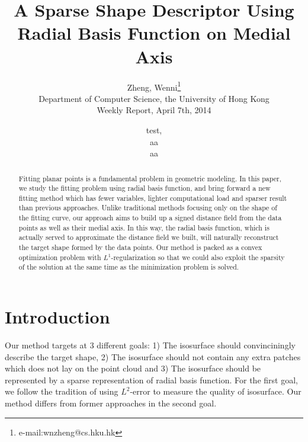 \documentclass[annual]{acmsiggraph}
\title{A Sparse Shape Descriptor Using Radial Basis Function on Medial Axis}
\author{Zheng, Wenni\thanks{e-mail:wnzheng@cs.hku.hk}\\Department of Computer Science, the University of Hong Kong\\Weekly Report, April 7th, 2014}
\author{test,\\aa\\aa}
\begin{document}

\maketitle

\begin{abstract}

Fitting planar points is a fundamental problem in geometric modeling. In this paper, we study the fitting problem using radial basis function, and bring forward a new fitting method which has fewer variables, lighter computational load and sparser result than previous approaches. Unlike traditional methods focusing only on the shape of the fitting curve, our approach aims to build up a signed distance field from the data points as well as their medial axis. In this way, the radial basis function, which is actually served to approximate the distance field we built, will naturally reconstruct the target shape formed by the data points. Our method is packed as a convex optimization problem with $L^1$-regularization so that we could also exploit the sparsity of the solution at the same time as the minimization problem is solved. 

\end{abstract}


\keywordlist


\copyrightspace

\section{Introduction}

Our method targets at 3 different goals: 1) The isosurface should convinciningly describe the target shape, 2) The isosurface should not contain any extra patches which does not lay on the point cloud and 3) The isosurface should be represented by a sparse representation of radial basis function. For the first goal, we follow the tradition of using $L^2$-error to measure the quality of isosurface. Our method differs from former approaches in the second goal.
\end{document}
